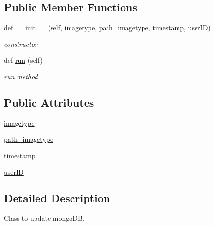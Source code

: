 \subsection*{Public Member Functions}
\begin{DoxyCompactItemize}
\item 
def \hyperlink{classimgapp_1_1uploadThreadClass_1_1updateMongoThread_aa2c07660d640e0dc5ce578df3ffcdf45}{\+\_\+\+\_\+init\+\_\+\+\_\+} (self, \hyperlink{classimgapp_1_1uploadThreadClass_1_1updateMongoThread_a7fad32b88c70b7f982c99b446776ad18}{imagetype}, \hyperlink{classimgapp_1_1uploadThreadClass_1_1updateMongoThread_a91aacecb1f2ae4f805f5d305235a365b}{path\+\_\+imagetype}, \hyperlink{classimgapp_1_1uploadThreadClass_1_1updateMongoThread_a81aeee9e6b727e234fbb83bcab0ec5db}{timestamp}, \hyperlink{classimgapp_1_1uploadThreadClass_1_1updateMongoThread_abb90747f1507aa83ad39ae4353cc7879}{user\+ID})
\begin{DoxyCompactList}\small\item\em constructor \end{DoxyCompactList}\item 
def \hyperlink{classimgapp_1_1uploadThreadClass_1_1updateMongoThread_a6f7cbd858ca77bc15b32adae2923438b}{run} (self)
\begin{DoxyCompactList}\small\item\em run method \end{DoxyCompactList}\end{DoxyCompactItemize}
\subsection*{Public Attributes}
\begin{DoxyCompactItemize}
\item 
\hyperlink{classimgapp_1_1uploadThreadClass_1_1updateMongoThread_a7fad32b88c70b7f982c99b446776ad18}{imagetype}
\item 
\hyperlink{classimgapp_1_1uploadThreadClass_1_1updateMongoThread_a91aacecb1f2ae4f805f5d305235a365b}{path\+\_\+imagetype}
\item 
\hyperlink{classimgapp_1_1uploadThreadClass_1_1updateMongoThread_a81aeee9e6b727e234fbb83bcab0ec5db}{timestamp}
\item 
\hyperlink{classimgapp_1_1uploadThreadClass_1_1updateMongoThread_abb90747f1507aa83ad39ae4353cc7879}{user\+ID}
\end{DoxyCompactItemize}


\subsection{Detailed Description}
Class to update mongo\+DB. 


